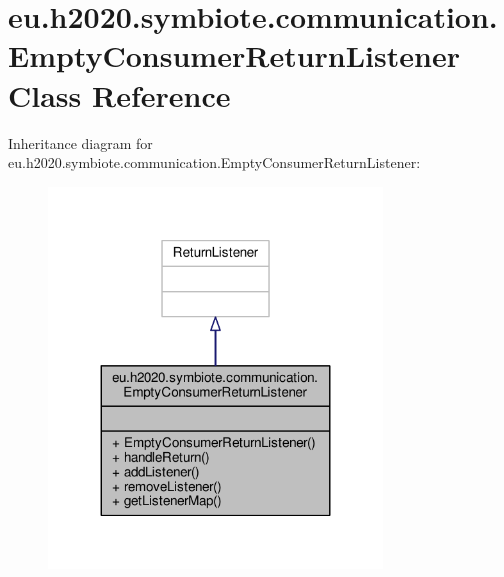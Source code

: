 \hypertarget{classeu_1_1h2020_1_1symbiote_1_1communication_1_1EmptyConsumerReturnListener}{}\section{eu.\+h2020.\+symbiote.\+communication.\+Empty\+Consumer\+Return\+Listener Class Reference}
\label{classeu_1_1h2020_1_1symbiote_1_1communication_1_1EmptyConsumerReturnListener}


Inheritance diagram for eu.\+h2020.\+symbiote.\+communication.\+Empty\+Consumer\+Return\+Listener\+:
\nopagebreak
\begin{figure}[H]
\begin{center}
\leavevmode
\includegraphics[width=251pt]{classeu_1_1h2020_1_1symbiote_1_1communication_1_1EmptyConsumerReturnListener__inherit__graph}
\end{center}
\end{figure}



